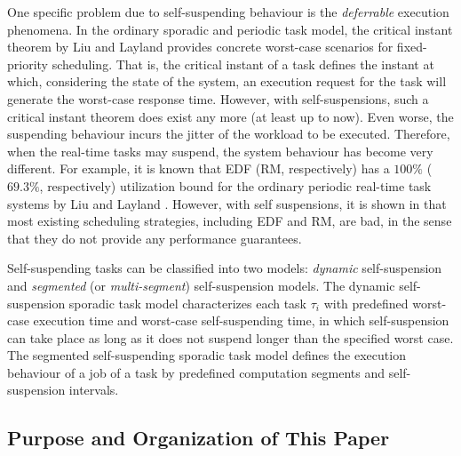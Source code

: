 One specific problem due to self-suspending behaviour is the \emph{deferrable} execution phenomena. In the ordinary sporadic and periodic task model, the critical instant theorem by Liu and Layland \cite{Liu_1973} provides concrete worst-case scenarios for fixed-priority scheduling.  That is, the critical instant of a task defines the instant at which, considering the state of the system, an execution request for the task will generate the worst-case response time.
However, with self-suspensions, such a critical instant theorem does exist any more (at least up to now). Even worse, the suspending behaviour incurs the jitter of the workload to be executed. Therefore, when the real-time tasks may suspend, the system behaviour has become very different. For example, it is known that EDF (RM, respectively) has a $100\%$ ($69.3\%$, respectively) utilization bound for the ordinary periodic real-time task systems by Liu and Layland \cite{Liu_1973}. However, with self suspensions,  it is shown in \cite{Ridouard_2004,RTSS-ChenL14} that most existing scheduling strategies, including EDF and RM, are bad, in the sense that they do not provide any performance guarantees. 

Self-suspending tasks can be classified into two models: \emph{dynamic} self-suspension and \emph{segmented} (or \emph{multi-segment}) self-suspension models.
The dynamic self-suspension sporadic task model characterizes each
task $\tau_i$ with predefined worst-case execution time and worst-case self-suspending time, in which self-suspension can take place as long as it does not suspend longer than the specified worst case. The segmented self-suspending sporadic task model defines the execution behaviour of a job of a task by predefined computation segments and self-suspension intervals.  

\subsection{Purpose and Organization of This Paper}

